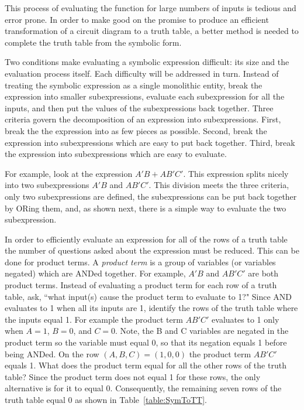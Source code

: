 This process of evaluating the function for large numbers of inputs is 
tedious and error prone.  In order to make good on the 
promise to produce an efficient transformation of a circuit diagram 
to a truth table, a better method is needed to complete the truth table
from the symbolic form.

Two conditions make evaluating a symbolic expression
difficult: its size and the evaluation process itself.  Each difficulty
will be addressed in turn.  Instead of treating the symbolic expression 
as a single monolithic entity, break the expression into smaller
subexpressions, evaluate each subexpression for all the inputs, and 
then put the values of the subexpressions back together.  Three criteria govern
the decomposition of an expression into subexpressions. First, break the 
the expression into as few pieces as possible.  Second, break the expression 
into subexpressions which are easy to put back together.  Third, break the
expression into subexpressions which are easy to evaluate.  

For example, look at the expression $A'B + AB'C'$.  This expression splits nicely
into two subexpressions $A'B$ and  $AB'C'$.  This division meets the three
criteria, only two subexpressions are defined, the subexpressions can be put
back together by ORing them, and, as shown next, there is a simple 
way to evaluate the two subexpression.

In order to efficiently evaluate an expression for all of the rows of a 
truth table the number of questions asked about the expression must
be reduced.  This can be done for product terms.
A \textit{product term}  is a group of variables 
(or variables negated) which are ANDed together.   For example, $A'B$ and  
$AB'C'$ are both product terms.  Instead of evaluating a product term for each
row of a truth table, ask, ``what input(s) cause the product term to 
evaluate to 1?"  Since AND evaluates to 1 when all its inputs are 1, 
identify the rows of the truth table where the inputs equal 1.
For example the product term $AB'C'$ evaluates to 1 only when $A=1$, $B=0$, and 
$C=0$.  Note, the B and C variables are negated in the product term so the 
variable must equal 0, so that its negation equals 1 before being ANDed.  
On the row $(A,B,C) = (1,0,0)$ the product term $AB'C'$ equals 1.  What
does the product term equal for all the other rows of the truth table?  
Since the product term does not equal 1 for these rows, the only alternative
is for it to equal 0.  Consequently, the remaining seven rows of the truth 
table equal 0 as shown in Table~\ref{table:SymToTT}.


